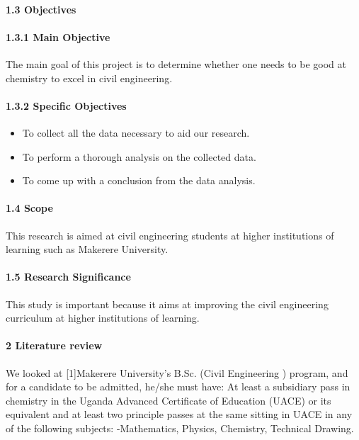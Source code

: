 \documentclass[10pt,a4paper]{article}
\begin{document}
\paragraph{1.3 Objectives}

\paragraph{1.3.1 Main Objective}
\begin{flushleft}
The main goal of this project is to determine whether one needs to be good at chemistry to excel in civil engineering. 
\end{flushleft}

\paragraph{1.3.2 Specific Objectives}
\begin{flushleft}
\begin{itemize}
	\item To collect all the data necessary to aid our research.
	\item To perform a thorough analysis on the collected data.
	\item To come up with a conclusion from the data analysis. 
\end{itemize}
\end{flushleft}

\paragraph{1.4 Scope}
\begin{flushleft}
This research is aimed at civil engineering students at higher institutions of learning such as Makerere University.
\end{flushleft}

\paragraph{1.5 Research Significance}
\begin{flushleft}
 This study is important because it aims at improving the civil engineering curriculum at higher institutions of learning.
\end{flushleft}

\paragraph{2 Literature review}
\begin{flushleft}
We looked at [1]Makerere University’s B.Sc. (Civil Engineering ) program, and for a candidate to be admitted, he/she must have: At least a subsidiary pass in chemistry in the Uganda Advanced Certificate of Education (UACE) or its equivalent and at least two principle passes at the same sitting in UACE in any of the following subjects: -Mathematics, Physics, Chemistry, Technical Drawing.
\end{flushleft}
\end{document}
